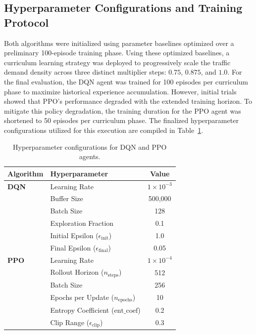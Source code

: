 \documentclass[conference]{IEEEtran}
\begin{document}
\subsection{Hyperparameter Configurations and Training Protocol}
Both algorithms were initialized using parameter baselines optimized over a preliminary 100-episode training phase. Using these optimized baselines, a curriculum learning strategy was deployed to progressively scale the traffic demand density across three distinct multiplier steps: $0.75$, $0.875$, and $1.0$. For the final evaluation, the DQN agent was trained for 100 episodes per curriculum phase to maximize historical experience accumulation. However, initial trials showed that PPO's performance degraded with the extended training horizon. To mitigate this policy degradation, the training duration for the PPO agent was shortened to 50 episodes per curriculum phase. The finalized hyperparameter configurations utilized for this execution are compiled in Table~\ref{tab:hyperparams}.

\begin{table}[h]
\centering
\caption{Hyperparameter configurations for DQN and PPO agents.}
\label{tab:hyperparams}
\begin{tabular}{llc}
\hline
\textbf{Algorithm} & \textbf{Hyperparameter} & \textbf{Value} \\ \hline
\textbf{DQN}       & Learning Rate & $1 \times 10^{-3}$ \\
                   & Buffer Size & 500,000 \\
                   & Batch Size & 128 \\
                   & Exploration Fraction & 0.1 \\
                   & Initial Epsilon ($\epsilon_{\text{init}}$) & 1.0 \\
                   & Final Epsilon ($\epsilon_{\text{final}}$) & 0.05 \\ \hline
\textbf{PPO}       & Learning Rate & $1 \times 10^{-4}$ \\
                   & Rollout Horizon ($n_{\text{steps}}$) & 512 \\
                   & Batch Size & 256 \\
                   & Epochs per Update ($n_{\text{epochs}}$) & 10 \\
                   & Entropy Coefficient ($\text{ent\_coef}$) & 0.2 \\
                   & Clip Range ($\epsilon_{\text{clip}}$) & 0.3 \\ \hline
\end{tabular}
\end{table}
\end{document}
